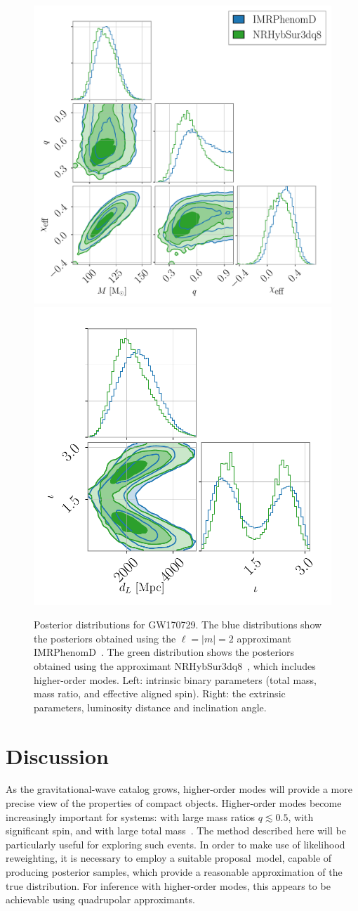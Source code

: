 \documentclass[prd,superscriptaddress,twocolumn,nopreprintnumbers,floatfix,longbibliography]{revtex4}
\newcommand{\sur}{{\sc NRHybSur3dq8}\xspace}
\newcommand{\proposal}{proposal}
\begin{document}
\begin{figure}[t!]
    \centering
    \includegraphics[width=0.56\linewidth]{GW170729_marg_intrinsic.pdf}
    \includegraphics[width=0.405\linewidth]{GW170729_marg_extrinsic.pdf}
    \caption{
    Posterior distributions for GW170729.
    The blue distributions show the posteriors obtained using the $\ell=|m|=2$ approximant {\sc IMRPhenomD}~\cite{IMRPhenomD}.
    The green distribution shows the posteriors obtained using the approximant \sur~\cite{NRHybSur3dq8}, which includes higher-order modes.
    Left: intrinsic binary parameters (total mass, mass ratio, and effective aligned spin). Right: the extrinsic parameters, luminosity distance and  inclination angle.
    }
    \label{fig:GW170729}
\end{figure}


\section{Discussion}\label{conclusions}
As the gravitational-wave catalog grows, higher-order modes will provide a more precise view of the properties of compact objects.
Higher-order modes become increasingly important for systems: with large mass ratios $q\lesssim0.5$, with significant spin, and with large total mass~\cite{vijay}.
The method described here will be particularly useful for exploring such events.
In order to make use of likelihood reweighting, it is necessary to employ a suitable \proposal\ model, capable of producing posterior samples, which provide a reasonable approximation of the true distribution.
For inference with higher-order modes, this appears to be achievable using quadrupolar approximants.
\end{document}

